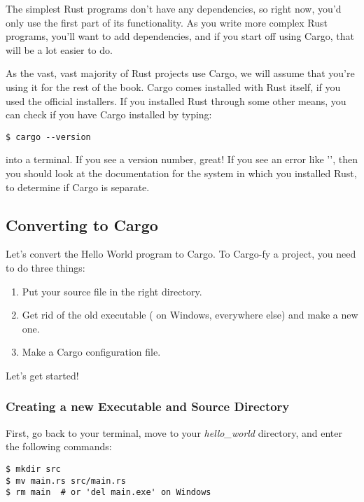 \blank

The simplest Rust programs don't have any dependencies, so right now, you'd only use the first part of its functionality. 
As you write more complex Rust programs, you'll want to add dependencies, and if you start off using Cargo, that will be 
a lot easier to do.

\blank

As the vast, vast majority of Rust projects use Cargo, we will assume that you're using it for the rest of the book. 
Cargo comes installed with Rust itself, if you used the official installers. If you installed Rust through some other 
means, you can check if you have Cargo installed by typing:

\begin{verbatim}
$ cargo --version
\end{verbatim}

into a terminal. If you see a version number, great! If you see an error like '', then you should look 
at the documentation for the system in which you installed Rust, to determine if Cargo is separate.

\subsection*{Converting to Cargo}

Let's convert the Hello World program to Cargo. To Cargo-fy a project, you need to do three things:

\begin{enumerate}
    \item{Put your source file in the right directory.}
    \item{Get rid of the old executable ( on Windows,  everywhere else) and make a new one.}
    \item{Make a Cargo configuration file.}
\end{enumerate}

Let's get started!

\subsubsection*{Creating a new Executable and Source Directory}

First, go back to your terminal, move to your \emph{hello\_world} directory, and enter the following commands:

\begin{verbatim}
$ mkdir src
$ mv main.rs src/main.rs
$ rm main  # or 'del main.exe' on Windows 
\end{verbatim}

